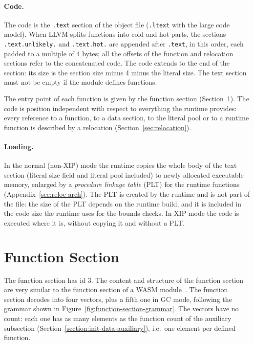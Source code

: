 \documentclass{article}
\begin{document}
\paragraph{Code.}
The code is the \verb|.text| section of the object file (\verb|.ltext| with the large code model).
When LLVM splits functions into cold and hot parts, the sections \verb|.text.unlikely.| and \verb|.text.hot.| are appended after \verb|.text|, in this order, each padded to a multiple of 4 bytes; all the offsets of the function and relocation sections refer to the concatenated code.
The code extends to the end of the section: its size is the section size minus 4 minus the literal size.
The text section must not be empty if the module defines functions.

The entry point of each function is given by the function section (Section~\ref{sec:function}).
The code is position independent with respect to everything the runtime provides: every reference to a function, to a data section, to the literal pool or to a runtime function is described by a relocation (Section~\ref{sec:relocation}).

\paragraph{Loading.}
In the normal (non-XIP) mode the runtime copies the whole body of the text section (literal size field and literal pool included) to newly allocated executable memory, enlarged by a \emph{procedure linkage table} (PLT) for the runtime functions (Appendix~\ref{sec:reloc-arch}).
The PLT is created by the runtime and is not part of the file: the size of the PLT depends on the runtime build, and it is included in the code size the runtime uses for the bounds checks.
In XIP mode the code is executed where it is, without copying it and without a PLT.

\section{Function Section}
\label{sec:function}
The function section has id 3.
The content and structure of the function section are very similar to the function section of a WASM module~\cite[Sec.~5.5.6]{webassembly2019core}.
The function section decodes into four vectors, plus a fifth one in GC mode, following the grammar shown in Figure~\ref{fig:function-section-grammar}.
The vectors have no count: each one has as many elements as the function count of the auxiliary subsection (Section~\ref{section:init-data-auxiliary}), i.e.\ one element per defined function.
\end{document}
